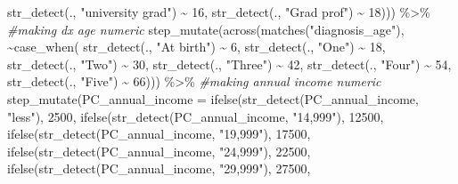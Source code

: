 \documentclass[
]{article}
\newenvironment{Shaded}{\begin{snugshade}}{\end{snugshade}}
\newcommand{\AttributeTok}[1]{\textcolor[rgb]{0.77,0.63,0.00}{#1}}
\newcommand{\CommentTok}[1]{\textcolor[rgb]{0.56,0.35,0.01}{\textit{#1}}}
\newcommand{\DecValTok}[1]{\textcolor[rgb]{0.00,0.00,0.81}{#1}}
\newcommand{\FunctionTok}[1]{\textcolor[rgb]{0.00,0.00,0.00}{#1}}
\newcommand{\NormalTok}[1]{#1}
\newcommand{\SpecialCharTok}[1]{\textcolor[rgb]{0.00,0.00,0.00}{#1}}
\newcommand{\StringTok}[1]{\textcolor[rgb]{0.31,0.60,0.02}{#1}}
\begin{document}
\begin{Shaded}
\begin{Highlighting}[]
                    \FunctionTok{str\_detect}\NormalTok{(., }\StringTok{"university grad"}\NormalTok{) }\SpecialCharTok{\textasciitilde{}} \DecValTok{16}\NormalTok{,}
                    \FunctionTok{str\_detect}\NormalTok{(., }\StringTok{"Grad prof"}\NormalTok{) }\SpecialCharTok{\textasciitilde{}} \DecValTok{18}\NormalTok{))) }\SpecialCharTok{\%\textgreater{}\%}
  \CommentTok{\#making dx age numeric}
                    \FunctionTok{step\_mutate}\NormalTok{(}\FunctionTok{across}\NormalTok{(}\FunctionTok{matches}\NormalTok{(}\StringTok{"diagnosis\_age"}\NormalTok{), }\SpecialCharTok{\textasciitilde{}}\FunctionTok{case\_when}\NormalTok{(}
                    \FunctionTok{str\_detect}\NormalTok{(., }\StringTok{"At birth"}\NormalTok{) }\SpecialCharTok{\textasciitilde{}} \DecValTok{6}\NormalTok{,}
                    \FunctionTok{str\_detect}\NormalTok{(., }\StringTok{"One"}\NormalTok{) }\SpecialCharTok{\textasciitilde{}} \DecValTok{18}\NormalTok{, }
                    \FunctionTok{str\_detect}\NormalTok{(., }\StringTok{"Two"}\NormalTok{) }\SpecialCharTok{\textasciitilde{}} \DecValTok{30}\NormalTok{,}
                    \FunctionTok{str\_detect}\NormalTok{(., }\StringTok{"Three"}\NormalTok{) }\SpecialCharTok{\textasciitilde{}} \DecValTok{42}\NormalTok{,}
                    \FunctionTok{str\_detect}\NormalTok{(., }\StringTok{"Four"}\NormalTok{) }\SpecialCharTok{\textasciitilde{}} \DecValTok{54}\NormalTok{,}
                    \FunctionTok{str\_detect}\NormalTok{(., }\StringTok{"Five"}\NormalTok{) }\SpecialCharTok{\textasciitilde{}} \DecValTok{66}\NormalTok{))) }\SpecialCharTok{\%\textgreater{}\%}
  \CommentTok{\#making annual income numeric}
                    \FunctionTok{step\_mutate}\NormalTok{(}\AttributeTok{PC\_annual\_income =} 
                                  \FunctionTok{ifelse}\NormalTok{(}\FunctionTok{str\_detect}\NormalTok{(PC\_annual\_income, }\StringTok{"less"}\NormalTok{), }\DecValTok{2500}\NormalTok{,}
                                  \FunctionTok{ifelse}\NormalTok{(}\FunctionTok{str\_detect}\NormalTok{(PC\_annual\_income, }\StringTok{"14,999"}\NormalTok{), }\DecValTok{12500}\NormalTok{,}
                                  \FunctionTok{ifelse}\NormalTok{(}\FunctionTok{str\_detect}\NormalTok{(PC\_annual\_income, }\StringTok{"19,999"}\NormalTok{), }\DecValTok{17500}\NormalTok{,}
                                  \FunctionTok{ifelse}\NormalTok{(}\FunctionTok{str\_detect}\NormalTok{(PC\_annual\_income, }\StringTok{"24,999"}\NormalTok{), }\DecValTok{22500}\NormalTok{,}
                                  \FunctionTok{ifelse}\NormalTok{(}\FunctionTok{str\_detect}\NormalTok{(PC\_annual\_income, }\StringTok{"29,999"}\NormalTok{), }\DecValTok{27500}\NormalTok{,}

\end{Highlighting}
\end{Shaded}
\end{document}
